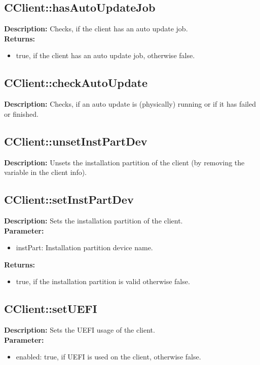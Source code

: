\subsection{CClient::hasAutoUpdateJob}
\textbf{Description:} Checks, if the client has an auto update job.\\
\textbf{Returns:}
\begin{itemize}
\item true, if the client has an auto update job, otherwise false.
\end{itemize}

\subsection{CClient::checkAutoUpdate}
\textbf{Description:} Checks, if an auto update is (physically) running or if it has failed or finished.\\

\subsection{CClient::unsetInstPartDev}
\textbf{Description:} Unsets the installation partition of the client (by removing the variable in the client info).\\

\subsection{CClient::setInstPartDev}
\textbf{Description:} Sets the installation partition of the client.\\
\textbf{Parameter:}
\begin{itemize}
\item instPart: Installation partition device name.
\end{itemize}
\textbf{Returns:}
\begin{itemize}
\item true, if the installation partition is valid otherwise false.
\end{itemize}

\subsection{CClient::setUEFI}
\textbf{Description:} Sets the UEFI usage of the client.\\
\textbf{Parameter:}
\begin{itemize}
\item enabled: true, if UEFI is used on the client, otherwise false.
\end{itemize}

